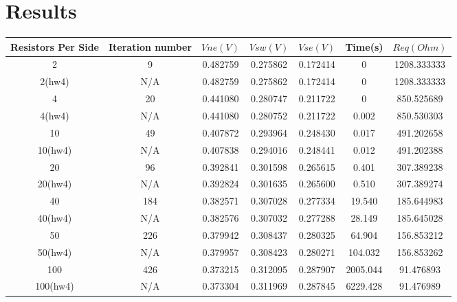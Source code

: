 \documentclass[12pt,a4paper]{article}
\begin{document}
\section{Results}

\begin{tabular}{|c|c|c|c|c|c|c|}
\hline  Resistors Per Side & Iteration number  & $Vne(V)$  & $Vsw(V)$ & $Vse(V)$  & Time(s) & $Req(Ohm)$ \\
\hline    2    		& 9     	& 0.482759 & 0.275862 & 0.172414  & 0  	& 1208.333333  \\
\hline    2(hw4)    & N/A     & 0.482759 & 0.275862 & 0.172414  & 0	 & 1208.333333  \\
\hline    4    		& 20   	& 0.441080 & 0.280747 & 0.211722  & 0       & 850.525689    \\
\hline    4(hw4)    & N/A     & 0.441080 & 0.280752 & 0.211722  & 0.002   & 850.530303  \\
\hline    10  		& 49   	& 0.407872 & 0.293964 & 0.248430  & 0.017       & 491.202658    \\
\hline    10(hw4)    & N/A     & 0.407838 & 0.294016 & 0.248441  & 0.012 & 491.202388  \\
\hline    20  		& 96   	& 0.392841 & 0.301598 & 0.265615  & 0.401       & 307.389238    \\
\hline    20(hw4)    & N/A     & 0.392824 & 0.301635 & 0.265600 & 0.510  & 307.389274  \\
\hline    40  		& 184 	& 0.382571 & 0.307028 & 0.277334  & 19.540     & 185.644983    \\
\hline    40(hw4)    & N/A     & 0.382576 & 0.307032 & 0.277288  & 28.149  & 185.645028  \\
\hline    50  		& 226 	& 0.379942 & 0.308437 & 0.280325  & 64.904     & 156.853212    \\
\hline    50(hw4)    & N/A     & 0.379957 & 0.308423 & 0.280271 & 104.032  & 156.853262  \\
\hline    100		& 426 	& 0.373215 & 0.312095 & 0.287907  & 2005.044 & 91.476893    \\
\hline    100(hw4)& N/A 	& 0.373304 & 0.311969 & 0.287845  & 6229.428 & 91.476989    \\\hline 
\end{tabular}\\
\end{document}
